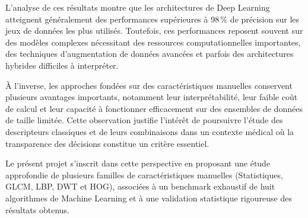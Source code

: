 L'analyse de ces résultats montre que les architectures de Deep Learning atteignent
généralement des performances supérieures à 98\,\% de précision sur les jeux de données les
plus utilisés. Toutefois, ces performances reposent souvent sur des modèles complexes
nécessitant des ressources computationnelles importantes, des techniques d'augmentation de
données avancées et parfois des architectures hybrides difficiles à interpréter.

À l'inverse, les approches fondées sur des caractéristiques manuelles conservent plusieurs
avantages importants, notamment leur interprétabilité, leur faible coût de calcul et leur
capacité à fonctionner efficacement sur des ensembles de données de taille limitée. Cette
observation justifie l'intérêt de poursuivre l'étude des descripteurs classiques et de leurs
combinaisons dans un contexte médical où la transparence des décisions constitue un critère
essentiel.

Le présent projet s'inscrit dans cette perspective en proposant une étude approfondie de
plusieurs familles de caractéristiques manuelles (Statistiques, GLCM, LBP, DWT et HOG),
associées à un benchmark exhaustif de huit algorithmes de Machine Learning et à une
validation statistique rigoureuse des résultats obtenus.

